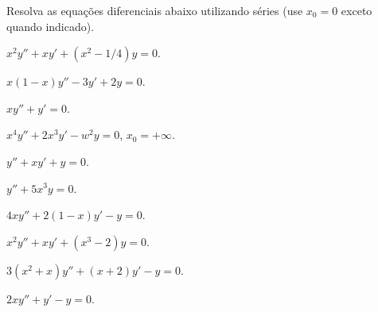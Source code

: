 \documentclass[a4paper,12pt, leqno, answers]{exam}
\begin{document}
\thispagestyle{headandfoot}
Resolva as equa\c{c}\~{o}es diferenciais abaixo utilizando s\'{e}ries (use $x_0 = 0$ exceto quando indicado).
\begin{questions}
    \question $x^2 y'' + x y' + \left( x^2 - 1/4 \right) y = 0$.
    \begin{solution}
        
    \end{solution}

    \question $x\left( 1 - x \right) y'' - 3 y' + 2y = 0$.
    \begin{solution}
        
    \end{solution}

    \question $x y'' + y' = 0$.
    \begin{solution}
        
    \end{solution}

    \question $x^4 y'' + 2 x^3 y' - w^2 y = 0$, $x_0 = + \infty$.
    \begin{solution}
        
    \end{solution}

    \question $y'' + x y' + y = 0$.
    \begin{solution}
        
    \end{solution}

    \question $y'' + 5 x^3 y = 0$.
    \begin{solution}
        
    \end{solution}

    \question $4 x y'' + 2 \left( 1 - x \right) y' - y = 0$.
    \begin{solution}
        
    \end{solution}

    \question $x^2 y'' + x y' + \left( x^3 - 2 \right) y = 0$.
    \begin{solution}
        
    \end{solution}

    \question $3 \left( x^2 + x \right) y'' + \left( x + 2 \right) y' - y = 0$.
    \begin{solution}
        
    \end{solution}

    \question $2 x y'' + y' - y = 0$.
    \begin{solution}
        

\end{solution}
\end{questions}
\end{document}
